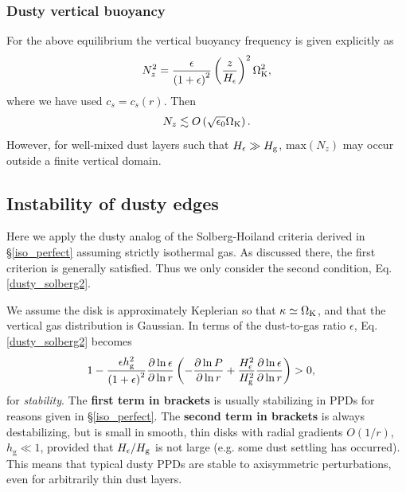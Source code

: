 \subsubsection{Dusty vertical buoyancy}\label{vbuoyancy}
For the above equilibrium the vertical buoyancy frequency is given
explicitly as 
\begin{align}
  N_z^2 =
 \frac{\epsilon}{\left(1+\epsilon\right)^2}\left(\frac{z}{H_\epsilon}\right)^2\Omega_{\rm K}^2\notag,  
\end{align}
where we have used $c_s=c_s(r)$. Then 
\begin{align*}
N_z\lesssim
O\left(\sqrt{\epsilon_0}\Omega_{\rm K}\right). 
\end{align*}
However, for well-mixed dust layers such that $H_\epsilon \gg H_\mathrm{g}$, 
$\mathrm{max}\left(N_z\right)$ may occur outside a finite vertical domain.  

\subsection{Instability of dusty edges} 
Here we apply the dusty analog of the Solberg-Hoiland criteria derived
in \S\ref{iso_perfect} assuming strictly isothermal gas. As discussed
there, the first criterion is generally satisfied. Thus we only
consider the second condition, Eq. \ref{dusty_solberg2}.  

We assume the disk is approximately Keplerian so that
$\kappa\simeq\Omega_{\rm K}$, and that the vertical gas distribution is   
Gaussian. In terms of the dust-to-gas
ratio $\epsilon$, Eq. \ref{dusty_solberg2}
becomes 
\begin{align}
&1 - \frac{\epsilon
  h_\mathrm{g}^2}{\left(1+\epsilon\right)^2}
  \frac{\partial\ln{\epsilon}}{\partial\ln{r}}\left(-\frac{\partial\ln{P}}{\partial\ln{r}}+\frac{H_\epsilon^2}{H_\mathrm{g}^2}\frac{\partial\ln{\epsilon}}{\partial\ln{r}}\right)
  > 0 \label{stability_est2},
\end{align}
for \emph{stability}. The {\bf first term in  brackets} is usually stabilizing in 
PPDs for reasons given in \S\ref{iso_perfect}. The {\bf second term in
brackets} is 
always destabilizing, but is small in smooth, thin disks with radial
gradients $O(1/r)$, $h_\mathrm{g}\ll 1$, 
provided that $H_\epsilon/H_\mathrm{g}$ is not large (e.g. some dust settling
has occurred). This means that typical dusty PPDs are stable to
axisymmetric perturbations, even for arbitrarily thin
dust layers. 

